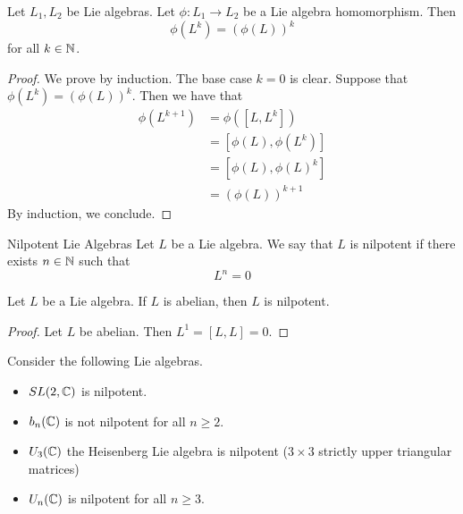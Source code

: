 \documentclass[a4paper]{article}
\begin{document}
\begin{lmm}{}{} Let $L_1,L_2$ be Lie algebras. Let $\phi:L_1\to L_2$ be a Lie algebra homomorphism. Then $$\phi(L^k)=(\phi(L))^k$$ for all $k\in\mathbb{N}$. \tcbline
\begin{proof}
We prove by induction. The base case $k=0$ is clear. Suppose that $\phi(L^k)=(\phi(L))^k$. Then we have that 
\begin{align*}
\phi(L^{k+1})&=\phi([L,L^k])\\
&=[\phi(L),\phi(L^k)]\\
&=[\phi(L),\phi(L)^k]\\
&=(\phi(L))^{k+1}
\end{align*}
By induction, we conclude. 
\end{proof}
\end{lmm}

\begin{defn}{Nilpotent Lie Algebras}{} Let $L$ be a Lie algebra. We say that $L$ is nilpotent if there exists $n\in\mathbb{N}$ such that $$L^n=0$$
\end{defn}

\begin{lmm}{}{} Let $L$ be a Lie algebra. If $L$ is abelian, then $L$ is nilpotent. \tcbline
\begin{proof}
Let $L$ be abelian. Then $L^1=[L,L]=0$. 
\end{proof}
\end{lmm}

\begin{eg}{}{} Consider the following Lie algebras. 
\begin{itemize}
\item $SL(2,\mathbb{C})$ is nilpotent. 
\item $b_n(\mathbb{C})$ is not nilpotent for all $n\geq 2$. 
\item $U_3(\mathbb{C})$ the Heisenberg Lie algebra is nilpotent ($3\times 3$ strictly upper triangular matrices)
\item $U_n(\mathbb{C})$ is nilpotent for all $n\geq 3$. 
\end{itemize}
\end{eg}
\end{document}

